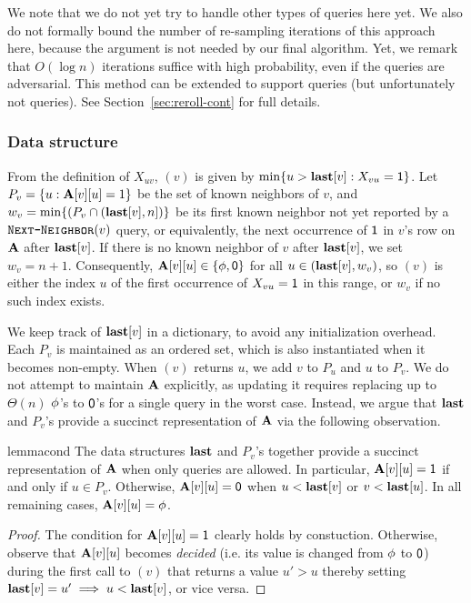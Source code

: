 We note that we do not yet try to handle other types of queries here yet.
We also do not formally bound the number of re-sampling iterations of this approach here, because the argument is not needed by our final algorithm.
Yet, we remark that $O(\log n)$ iterations suffice with high probability, even if the queries are adversarial.
This method can be extended to support  queries (but unfortunately not  queries).
See Section~\ref{sec:reroll-cont} for full details.

\subsubsection{Data structure}\label{sec:nn-ds}

From the definition of $X_{uv}$, $(v)$ is given by $\min\{u > \mathbf{last}[v]: X_{vu} = \mathsf{1}\}$.
Let $P_v = \{u: \mathbf{A}[v][u]=1\}$ be the set of known neighbors of $v$, and $w_v = \min \{(P_v \cap (\mathbf{last}[v], n])\}$ be its first known neighbor
not yet reported by a $\texttt{\textsc{Next-Neighbor}}(v)$ query, or equivalently, the next occurrence of $\mathsf{1}$ in $v$'s row on $\mathbf{A}$ after $\mathbf{last}[v]$.
If there is no known neighbor of $v$ after $\mathbf{last}[v]$, we set $w_v = n+1$.
Consequently, $\mathbf{A}[v][u] \in \{\phi,\mathsf{0}\}$ for all $u \in (\mathbf{last}[v], w_v)$,
so $(v)$ is either the index $u$ of the first occurrence of $X_{vu} = \mathsf{1}$ in this range, or $w_v$ if no such index exists.

We keep track of $\mathbf{last}[v]$ in a dictionary, to avoid any initialization overhead.
Each $P_v$ is maintained as an ordered set, which is also instantiated when it becomes non-empty.
When $(v)$ returns $u$, we add $v$ to $P_u$ and $u$ to $P_v$.
We do not attempt to maintain $\mathbf{A}$ explicitly, as updating it requires replacing up to $\Theta(n)$ $\phi$'s to $\mathsf{0}$'s
for a single  query in the worst case.
Instead, we argue that $\mathbf{last}$ and $P_v$'s provide a succinct representation of $\mathbf{A}$ via the following observation.

\begin{restatable}{lemma}{cond}\label{lem:cond-0}
The data structures $\mathbf{last}$ and $P_v$'s together provide a succinct representation of $\mathbf{A}$ when only  queries are allowed. In particular, $\mathbf{A}[v][u]=\mathsf{1}$ if and only if $u \in P_v$. Otherwise, $\mathbf{A}[v][u]=\mathsf{0}$ when $u <\mathbf{last}[v]$ or $v < \mathbf{last}[u]$. In all remaining cases, $\mathbf{A}[v][u]=\phi$.
\end{restatable}
\begin{proof}
The condition for $\mathbf{A}[v][u]=\mathsf{1}$ clearly holds by constuction.
Otherwise, observe that $\mathbf{A}[v][u]$ becomes \emph{decided} (i.e. its value is changed from $\phi$ to $\mathsf{0}$)
during the first call to $(v)$ that returns a value $u' > u$ thereby setting $\mathbf{last}[v] = u' \implies u<\mathbf{last}[v]$, or vice versa.
\end{proof}



